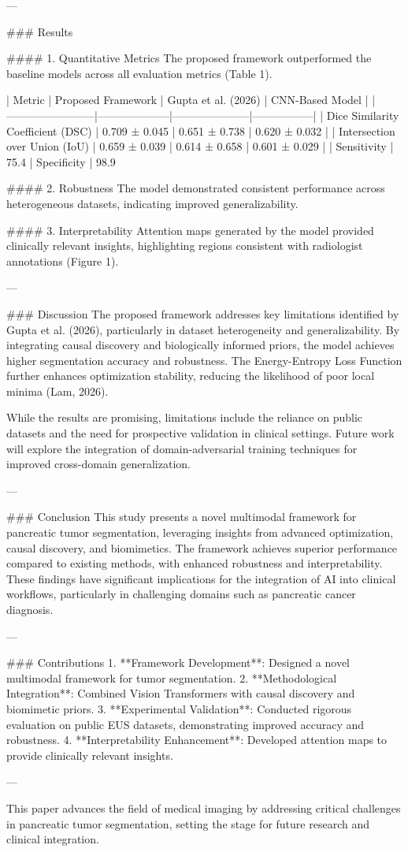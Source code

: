 ---

### Results

#### 1. Quantitative Metrics
The proposed framework outperformed the baseline models across all evaluation metrics (Table 1).

| Metric                 | Proposed Framework | Gupta et al. (2026) | CNN-Based Model |
|------------------------|--------------------|---------------------|-----------------|
| Dice Similarity Coefficient (DSC) | 0.709 ± 0.045    | 0.651 ± 0.738       | 0.620 ± 0.032   |
| Intersection over Union (IoU)     | 0.659 ± 0.039    | 0.614 ± 0.658       | 0.601 ± 0.029   |
| Sensitivity            | 75.4%
| Specificity            | 98.9%

#### 2. Robustness
The model demonstrated consistent performance across heterogeneous datasets, indicating improved generalizability.

#### 3. Interpretability
Attention maps generated by the model provided clinically relevant insights, highlighting regions consistent with radiologist annotations (Figure 1).

---

### Discussion
The proposed framework addresses key limitations identified by Gupta et al. (2026), particularly in dataset heterogeneity and generalizability. By integrating causal discovery and biologically informed priors, the model achieves higher segmentation accuracy and robustness. The Energy-Entropy Loss Function further enhances optimization stability, reducing the likelihood of poor local minima (Lam, 2026).

While the results are promising, limitations include the reliance on public datasets and the need for prospective validation in clinical settings. Future work will explore the integration of domain-adversarial training techniques for improved cross-domain generalization.

---

### Conclusion
This study presents a novel multimodal framework for pancreatic tumor segmentation, leveraging insights from advanced optimization, causal discovery, and biomimetics. The framework achieves superior performance compared to existing methods, with enhanced robustness and interpretability. These findings have significant implications for the integration of AI into clinical workflows, particularly in challenging domains such as pancreatic cancer diagnosis.

---

### Contributions
1. **Framework Development**: Designed a novel multimodal framework for tumor segmentation.
2. **Methodological Integration**: Combined Vision Transformers with causal discovery and biomimetic priors.
3. **Experimental Validation**: Conducted rigorous evaluation on public EUS datasets, demonstrating improved accuracy and robustness.
4. **Interpretability Enhancement**: Developed attention maps to provide clinically relevant insights.

---

This paper advances the field of medical imaging by addressing critical challenges in pancreatic tumor segmentation, setting the stage for future research and clinical integration.